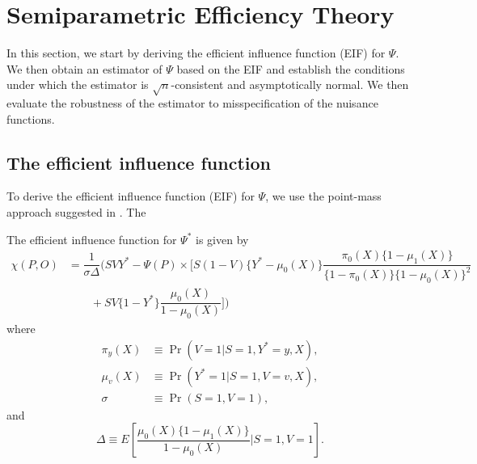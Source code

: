   \section{Semiparametric Efficiency Theory}\label{sec:eif}
    In this section, we start by deriving the efficient influence function (EIF) for $\Psi$. We then obtain an estimator of $\Psi$ based on the EIF and establish the conditions under which the estimator is $\sqrt{n}$-consistent and asymptotically normal. We then evaluate the robustness of the estimator to misspecification of the nuisance functions. 
    
    \subsection{The efficient influence function}
    To derive the efficient influence function (EIF) for $\Psi$, we use the point-mass approach suggested in \textcite{hines_demystifying_2022}. The 
    \begin{lemma}
        The efficient influence function for $\Psi^*$ is given by 
        \begin{align*}
         \chi(P, O) &= \dfrac{1}{\sigma \Delta} \Bigg(S V Y^* - \Psi(P)  \times \bigg[S(1 - V)\{Y^* - \mu_0(X)\}\dfrac{\pi_0(X)\{1 - \mu_1(X)\}}{\{1 - \pi_0(X)\}\{1 - \mu_0(X)\}^2}\\
        &\qquad + S V\{1-Y^*\}\dfrac{\mu_0(X)}{1 - \mu_0(X)}\bigg] \Bigg)
    \end{align*}
    where 
    \begin{align*}
        \pi_y(X) &\equiv \Pr(V = 1 | S = 1, Y^* = y, X), \\
        \mu_v(X) &\equiv \Pr(Y^* = 1 | S = 1, V = v, X), \\
        \sigma &\equiv \Pr(S = 1, V = 1),
    \end{align*}
    and 
    \begin{equation*}
        \Delta \equiv E\left[\dfrac{\mu_0(X)\{1 - \mu_1(X)\}}{1 - \mu_0(X)} \bigg| S=1, V=1\right].
    \end{equation*}
    \end{lemma}

